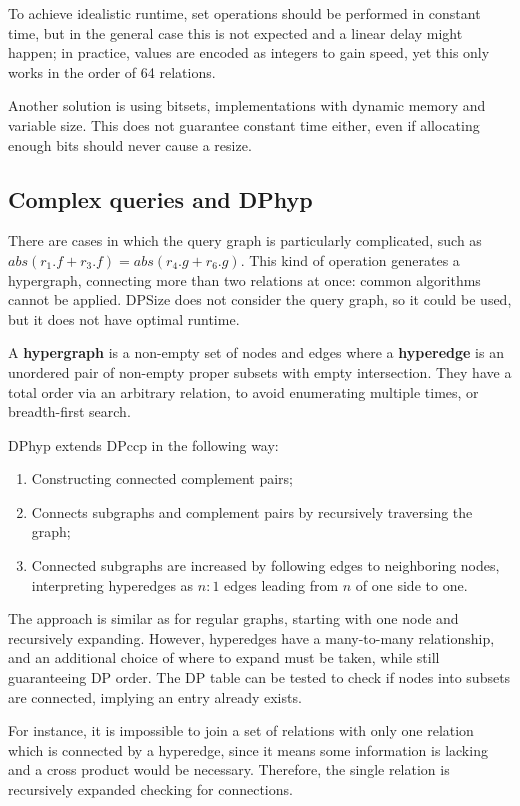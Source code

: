 To achieve idealistic runtime, set operations should be performed in constant time, but in the general case this is not expected and a linear delay might happen; in practice, values are encoded as integers to gain speed, yet this only works in the order of 64 relations.

Another solution is using bitsets, implementations with dynamic memory and variable size. This does not guarantee constant time either, even if allocating enough bits should never cause a resize.

\subsection{Complex queries and DPhyp}
There are cases in which the query graph is particularly complicated, such as $abs(r_1.f + r_3.f) = abs(r_4.g + r_6.g)$. This kind of operation generates a hypergraph, connecting more than two relations at once: common algorithms cannot be applied. DPSize does not consider the query graph, so it could be used, but it does not have optimal runtime.

A \textbf{hypergraph} is a non-empty set of nodes and edges where a \textbf{hyperedge} is an unordered pair of non-empty proper subsets with empty intersection. They have a total order via an arbitrary relation, to avoid enumerating multiple times, or breadth-first search.

DPhyp extends DPccp in the following way:
\begin{enumerate}
	\item Constructing connected complement pairs;
	\item Connects subgraphs and complement pairs by recursively traversing the graph;
	\item Connected subgraphs are increased by following edges to neighboring nodes, interpreting hyperedges as $n : 1$ edges leading from $n$ of one side to one.
\end{enumerate}

The approach is similar as for regular graphs, starting with one node and recursively expanding. However, hyperedges have a many-to-many relationship, and an additional choice of where to expand must be taken, while still guaranteeing DP order. The DP table can be tested to check if nodes into subsets are connected, implying an entry already exists. 

For instance, it is impossible to join a set of relations with only one relation which is connected by a hyperedge, since it means some information is lacking and a cross product would be necessary. Therefore, the single relation is recursively expanded checking for connections.

